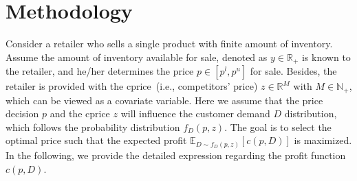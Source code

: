 \documentclass[competition,nonblindrev, 12pt]{informs3-competition}
\theoremstyle{TH}%
\theoremstyle{TH}%
\begin{document}
\section{Methodology}\label{Sec:method}
Consider a retailer who sells a single product with finite amount of inventory.
Assume the amount of inventory available for sale, denoted as $y\in\mathbb{R}_+$ is known to the retailer, and he/her determines the price $p\in[p^l, p^u]$ for sale.
Besides, the retailer is provided with the cprice~(i.e., competitors' price) $z\in \mathbb{R}^{M}$ with $M\in\mathbb{N}_+$, which can be viewed as a covariate variable.
Here we assume that the price decision $p$ and the cprice $z$ will influence the customer demand $D$ distribution, which follows the probability distribution $f_D(p, z)$.
The goal is to select the optimal price such that the expected profit $\mathbb{E}_{D\sim f_D(p,z)}[c(p,D)]$ is maximized.
In the following, we provide the detailed expression regarding the profit function $c(p,D)$.
\end{document}
